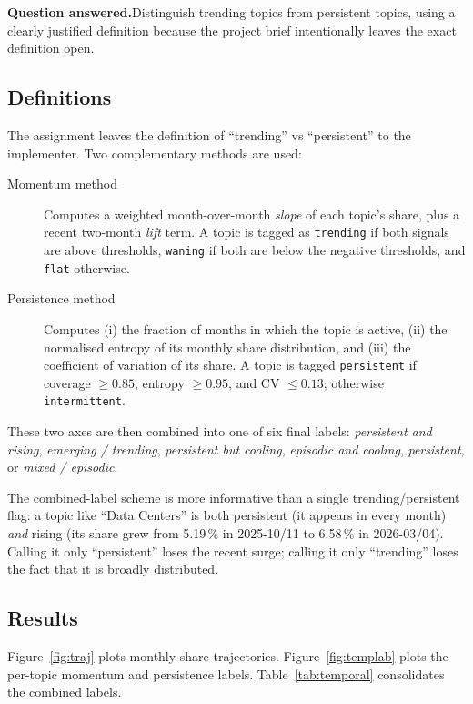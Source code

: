 \documentclass[11pt,a4paper]{article}
\newenvironment{designbox}{%
  \par\medskip\noindent
  \def\FrameCommand{\fboxsep=6pt\fboxrule=0.4pt%
    \fcolorbox{designboxrule}{designboxbg}}%
  \MakeFramed{\advance\hsize-2\fboxsep\FrameRestore}%
  \noindent{\sffamily\bfseries Design choice.}\quad\ignorespaces%
}{\endMakeFramed\par\medskip}
\newcommand{\questionanswered}[1]{%
  \par\medskip\noindent\textbf{Question answered.}\quad #1\par\medskip%
}
\begin{document}
\questionanswered{Distinguish trending topics from persistent topics, using a clearly justified
definition because the project brief intentionally leaves the exact definition open.}

\subsection{Definitions}
The assignment leaves the definition of ``trending'' vs ``persistent'' to the implementer.
Two complementary methods are used:

\begin{description}
  \item[Momentum method] Computes a weighted month-over-month \emph{slope} of each topic's share,
        plus a recent two-month \emph{lift} term. A topic is tagged as
        \texttt{trending} if both signals are above thresholds, \texttt{waning} if both are below
        the negative thresholds, and \texttt{flat} otherwise.
  \item[Persistence method] Computes (i) the fraction of months in which the topic is active,
        (ii) the normalised entropy of its monthly share distribution, and
        (iii) the coefficient of variation of its share. A topic is tagged \texttt{persistent} if
        coverage $\geq 0.85$, entropy $\geq 0.95$, and CV $\leq 0.13$; otherwise
        \texttt{intermittent}.
\end{description}

These two axes are then combined into one of six final labels: \emph{persistent and rising},
\emph{emerging / trending}, \emph{persistent but cooling}, \emph{episodic and cooling},
\emph{persistent}, or \emph{mixed / episodic}.

\begin{designbox}
The combined-label scheme is more informative than a single trending/persistent flag: a topic
like ``Data Centers'' is both persistent (it appears in every month) \emph{and} rising (its share
grew from 5.19\,\% in 2025-10/11 to 6.58\,\% in 2026-03/04). Calling it only ``persistent'' loses
the recent surge; calling it only ``trending'' loses the fact that it is broadly distributed.
\end{designbox}

\subsection{Results}
Figure~\ref{fig:traj} plots monthly share trajectories. Figure~\ref{fig:templab} plots the
per-topic momentum and persistence labels. Table~\ref{tab:temporal} consolidates the combined
labels.
\end{document}
